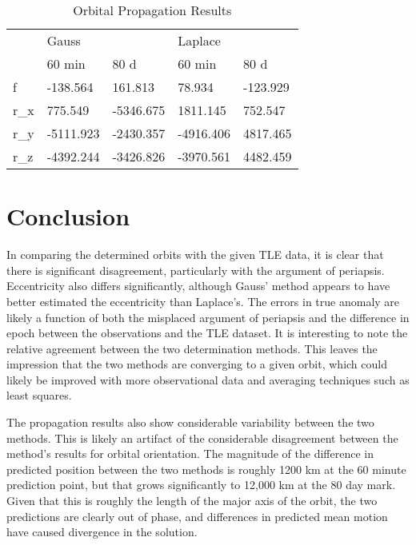 \documentclass[11pt,twoside,letterpaper]{article}
\begin{document}
  \begin{table}
    \centering
    \begin{tabular}{lllll}
      & \multicolumn{2}{l}{Gauss} & \multicolumn{2}{l}{Laplace} \\
      & 60 min & 80 d & 60 min & 80 d \\ \cline{2-5} 
      \multicolumn{1}{l|}{f} & \multicolumn{1}{l|}{-138.564} &
      \multicolumn{1}{l|}{161.813} & \multicolumn{1}{l|}{78.934} & \multicolumn{1}{l|}{-123.929} \\ \cline{2-5} 
      \multicolumn{1}{l|}{r_x} & \multicolumn{1}{l|}{775.549} &
      \multicolumn{1}{l|}{-5346.675} & \multicolumn{1}{l|}{1811.145} & \multicolumn{1}{l|}{752.547} \\ \cline{2-5} 
      \multicolumn{1}{l|}{r_y} & \multicolumn{1}{l|}{-5111.923} &
      \multicolumn{1}{l|}{-2430.357} & \multicolumn{1}{l|}{-4916.406} & \multicolumn{1}{l|}{4817.465} \\ \cline{2-5} 
      \multicolumn{1}{l|}{r_z} & \multicolumn{1}{l|}{-4392.244} &
      \multicolumn{1}{l|}{-3426.826} & \multicolumn{1}{l|}{-3970.561} & \multicolumn{1}{l|}{4482.459} \\ \cline{2-5} 
    \end{tabular}
    \caption{Orbital Propagation Results}
    \label{propagationResults}
  \end{table}
  
  \section{Conclusion}
  In comparing the determined orbits with the given TLE data, it is
  clear that there is significant disagreement, particularly with the
  argument of periapsis. Eccentricity also differs significantly,
  although Gauss' method appears to have better estimated the
  eccentricity than Laplace's. The errors in true anomaly are likely a
  function of both the misplaced argument of periapsis and the
  difference in epoch between the observations and the TLE dataset. It
  is interesting to note the relative agreement between the two
  determination methods. This leaves the impression that the two
  methods are converging to a given orbit, which could likely be
  improved with more observational data and averaging techniques such
  as least squares.

  The propagation results also show considerable variability between
  the two methods. This is likely an artifact of the considerable
  disagreement between the method's results for orbital
  orientation. The magnitude of the difference in predicted position
  between the two methods is roughly 1200 km at the 60 minute
  prediction point, but that grows significantly to 12,000 km at the
  80 day mark. Given that this is roughly the length of the major axis
  of the orbit, the two predictions are clearly out of phase, and
  differences in predicted mean motion have caused divergence in the
  solution.
\end{document}
